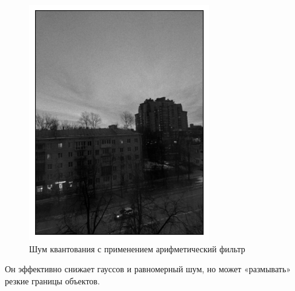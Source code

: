 \documentclass[a4paper,12pt]{article}
\begin{document}
\begin{figure}[H]
\begin{minipage}{0.49\textwidth}
        \centering \includegraphics[width=\textwidth]{results/lpf_pois_1.png}
        \caption{Шум квантования с применением арифметический фильтр}
    \end{minipage}
\end{figure}
Он эффективно снижает гауссов и равномерный шум, но может «размывать» резкие границы объектов.
\end{document}
